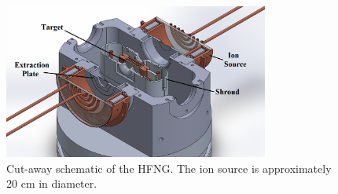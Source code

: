 \documentclass[5p]{elsarticle}
\newcommand{\comment}[1]{\todo[color=blue!20!white,inline]{ASV: #1}}
\begin{document}



\begin{figure}
    \centering
        \centering
        \includegraphics[height=2in]{./figures/cutaway.png}
        \caption{Cut-away schematic of the HFNG. The ion source is approximately 20 cm in diameter.}
                \label{fig:hfng_b}
\end{figure}

\end{document}
